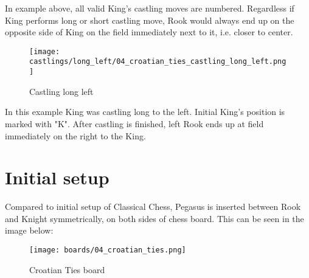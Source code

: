 In example above, all valid King's castling moves are numbered. Regardless if King performs
long or short castling move, Rook would always end up on the opposite side of King on the
field immediately next to it, i.e. closer to center.

\noindent
\begin{figure}[!h]
\texttt{[image: castlings/long\_left/04\_croatian\_ties\_castling\_long\_left.png]}
\caption{Castling long left}
\label{fig:04_croatian_ties_castling_long_left}
\end{figure}

In this example King was castling long to the left. Initial King's position is marked with "K".
After castling is finished, left Rook ends up at field immediately on the right to the King.

\clearpage %

\section*{Initial setup}

Compared to initial setup of Classical Chess, Pegasus is inserted between Rook and Knight
symmetrically, on both sides of chess board. This can be seen in the image below:

\noindent
\begin{figure}[h]
\texttt{[image: boards/04\_croatian\_ties.png]}
\caption{Croatian Ties board}
\label{fig:04_croatian_ties}
\end{figure}

\clearpage %
